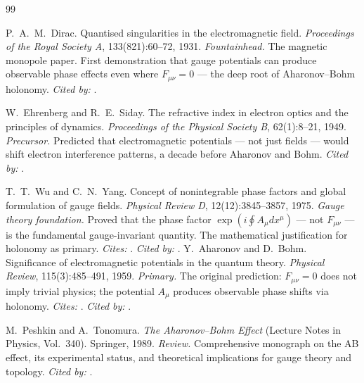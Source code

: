 \documentclass[12pt,a4paper]{article}
\begin{document}
\begin{thebibliography}{99}

P.~A.~M.~Dirac.
\newblock Quantised singularities in the electromagnetic field.
\newblock \emph{Proceedings of the Royal Society A}, 133(821):60--72, 1931.
\newblock \textit{Fountainhead.} The magnetic monopole paper. First demonstration that
gauge potentials can produce observable phase effects even where $F_{\mu\nu}=0$ ---
the deep root of Aharonov--Bohm holonomy. \textit{Cited by:} \cite{aharonov1959,wuyang1975}.

W.~Ehrenberg and R.~E.~Siday.
\newblock The refractive index in electron optics and the principles of dynamics.
\newblock \emph{Proceedings of the Physical Society B}, 62(1):8--21, 1949.
\newblock \textit{Precursor.} Predicted that electromagnetic potentials --- not just fields ---
would shift electron interference patterns, a decade before Aharonov and Bohm.
\textit{Cited by:} \cite{aharonov1959,peshkin1989}.

T.~T.~Wu and C.~N.~Yang.
\newblock Concept of nonintegrable phase factors and global formulation of gauge fields.
\newblock \emph{Physical Review D}, 12(12):3845--3857, 1975.
\newblock \textit{Gauge theory foundation.} Proved that the phase factor $\exp(i\oint A_\mu dx^\mu)$
--- not $F_{\mu\nu}$ --- is the fundamental gauge-invariant quantity. The mathematical
justification for holonomy as primary. \textit{Cites:} \cite{dirac1931,aharonov1959}.
\textit{Cited by:} \cite{nakahara2003}.
Y.~Aharonov and D.~Bohm.
\newblock Significance of electromagnetic potentials in the quantum theory.
\newblock \emph{Physical Review}, 115(3):485--491, 1959.
\newblock \textit{Primary.} The original prediction: $F_{\mu\nu}=0$ does not imply trivial
physics; the potential $A_\mu$ produces observable phase shifts via holonomy.
\newblock \textit{Cites:} \cite{dirac1931,ehrenberg1949}.
\textit{Cited by:} \cite{tonomura1986,peshkin1989,berry1984,wuyang1975}.

M.~Peshkin and A.~Tonomura.
\newblock \emph{The Aharonov--Bohm Effect} (Lecture Notes in Physics, Vol.~340).
\newblock Springer, 1989.
\newblock \textit{Review.} Comprehensive monograph on the AB effect, its experimental status,
and theoretical implications for gauge theory and topology.
\textit{Cited by:} \cite{nakahara2003}.


\end{thebibliography}
\end{document}

